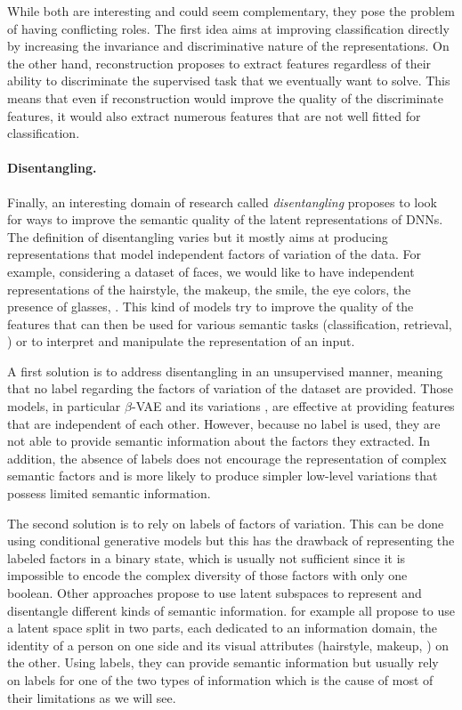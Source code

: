 While both are interesting and could seem complementary, they pose the problem of having conflicting roles. The first idea aims at improving classification directly by increasing the invariance and discriminative nature of the representations. On the other hand, reconstruction proposes to extract features regardless of their ability to discriminate the supervised task that we eventually want to solve. This means that even if reconstruction would improve the quality of the discriminate features, it would also extract numerous features that are not well fitted for classification.


\paragraph{Disentangling.} Finally, an interesting domain of research called \textit{disentangling} proposes to look for ways to improve the semantic quality of the latent representations of \acp{DNN}. The definition of disentangling varies \citep{higgins2018towards} but it mostly aims at producing representations that model independent factors of variation of the data. For example, considering a dataset of faces, we would like to have independent representations of the hairstyle, the makeup, the smile, the eye colors, the presence of glasses, \etc. This kind of models try to improve the quality of the features that can then be used for various semantic tasks (classification, retrieval, \etc) or to interpret and manipulate the representation of an input.

A first solution is to address disentangling in an unsupervised manner, meaning that no label regarding the factors of variation of the dataset are provided. Those models, in particular $\beta$-\acs{VAE} \citep{higgins2017beta} and its variations \citep{chen2018isolating,Klys2018}, are effective at providing features that are independent of each other. However, because no label is used, they are not able to provide semantic information about the factors they extracted. In addition, the absence of labels does not encourage the representation of complex semantic factors and is more likely to produce simpler low-level variations that possess limited semantic information.

The second solution is to rely on labels of factors of variation. This can be done using conditional generative models \citep{perarnau2016invertible,Lample2017} but this has the drawback of representing the labeled factors in a binary state, which is usually not sufficient since it is impossible to encode the complex diversity of those factors with only one boolean. Other approaches propose to use latent subspaces to represent and disentangle different kinds of semantic information. \citet{Mathieu2016,Hadad2018,Liu2018a} for example all propose to use a latent space split in two parts, each dedicated to an information domain, \eg the identity of a person on one side and its visual attributes (hairstyle, makeup, \etc) on the other. Using labels, they can provide semantic information but usually rely on labels for one of the two types of information which is the cause of most of their limitations as we will see.


